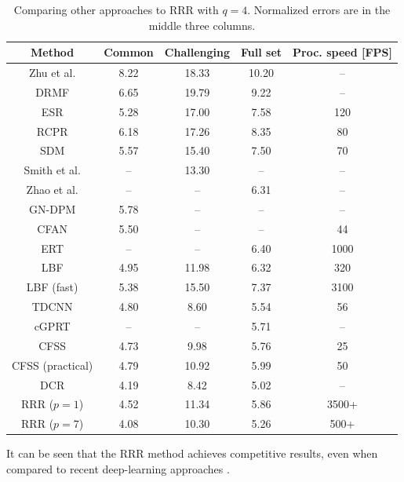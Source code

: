 \documentclass{article}
\begin{document}
		\begin{table}
			\centering
			\resizebox{0.5\textwidth}{!}
			{
			\begin{tabular}{| c || c | c | c || c |}
				\hline
				Method	&	Common	&	Challenging	&	Full set	&	Proc. speed [FPS]	\\
				\hline
				\hline
				Zhu et al. \cite{zhuetal}	&	8.22	&	18.33	&	10.20	&	--	\\
				\hline
				DRMF \cite{DRMF}	&	6.65	&	19.79	&	9.22	&	--	\\
				\hline
				ESR \cite{microsoft_face_align}	&	5.28	&	17.00	&	7.58	&	120	\\
				\hline
				RCPR \cite{RCPR}	&	6.18	&	17.26	&	8.35	&	80	\\
				\hline
				SDM \cite{SDM}	&	5.57	&	15.40	&	7.50	&	70	\\
				\hline
				Smith et al. \cite{smithetal}	&	--	&	13.30	&	--	&	--	\\
				\hline
				Zhao et al. \cite{zhaoetal}	&	--	&	--	&	6.31	&	--	\\
				\hline
				GN-DPM \cite{GN-DPM}	&	5.78	&	--	&	--	&	--	\\
				\hline
				CFAN \cite{CFAN}	&	5.50	&	--	&	--	&	44	\\
				\hline
				ERT \cite{ERT}	&	--	&	--	&	6.40	&	1000	\\
				\hline
				LBF \cite{lbf}	&	4.95	&	11.98	&	6.32	&	320	\\
				\hline
				LBF (fast) \cite{lbf}	&	5.38	&	15.50	&	7.37	&	3100	\\
				\hline
				TDCNN \cite{TDCNN}	&	4.80	&	8.60	&	5.54	&	56	\\
				\hline
				cGPRT \cite{cGPRT}	&	--	&	--	&	5.71	&	--	\\
				\hline
				CFSS \cite{CFSS}	&	4.73	&	9.98	&	5.76	&	25	\\
				\hline
				CFSS (practical) \cite{CFSS}	&	4.79	&	10.92	&	5.99	&	50	\\
				\hline
				DCR \cite{DCR}	&	4.19	&	8.42	&	5.02	&	--	\\
				\hline
				\hline
				RRR ($p=1$)	&	4.52	&	11.34	&	5.86	&	3500+	\\
				\hline
				RRR ($p=7$)	&	4.08	&	10.30	&	5.26	&	500+	\\
				\hline
			\end{tabular}
			}
			\caption
			{
				Comparing other approaches to RRR with $q=4$.
				Normalized errors are in the middle three columns.
			}
			\label{tbl:300w-cmp}
		\end{table}
		It can be seen that the RRR method achieves competitive results, even when compared to recent deep-learning approaches \cite{DCR}.
\end{document}

